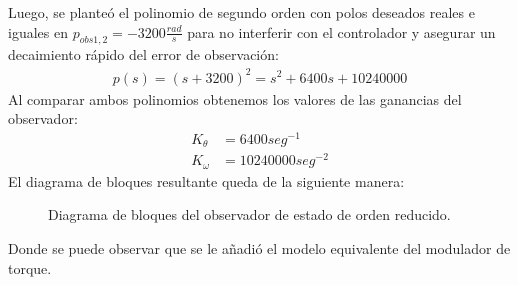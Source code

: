 \documentclass[a4paper, 10pt, onecolumn,journal]{ieeeconf}
\begin{document}
Luego, se planteó el polinomio de segundo orden con polos deseados reales e iguales en $p_{obs1,2} = -3200 \frac{rad}{s}$ para no interferir con el controlador y asegurar un decaimiento rápido del error de observación:
\begin{align}
	p(s) = \left( s + 3200\right) ^2 = s^2 + 6400 s + 10240000\label{polinomeo caracteristico de observador deseado}
\end{align}
Al comparar ambos polinomios obtenemos los valores de las ganancias del observador:
\begin{align}
	K_{\theta} &= 6400 seg^{-1}\label{ganacia de posicion de observador}\\
	K_{\omega} &= 10240000 seg^{-2}\label{ganacia de velocidad de observador}
\end{align}
El diagrama de bloques resultante queda de la siguiente manera:
\begin{figure}[H]
	\centering
	\begin{adjustbox}{max width=\columnwidth,scale=0.8}
	\end{adjustbox}
	\caption{Diagrama de bloques del observador de estado de orden reducido.}
	\label{Diagrama de bloques del observador de estado de orden reducido}
\end{figure}
Donde se puede observar que se le añadió el modelo equivalente del modulador de torque.
\end{document}
